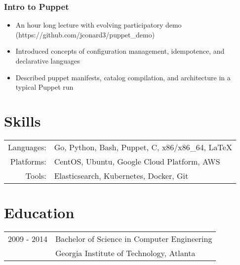 \documentclass[letterpaper]{article}
\begin{document}
\subsubsection*{Intro to Puppet}
\begin{itemize}[noitemsep]
	\item An hour long lecture with evolving participatory demo (https://github.com/jconard3/puppet\_demo)
	\item Introduced concepts of configuration management, idempotence, and declarative languages
	\item Described puppet manifests, catalog compilation, and architecture in a typical Puppet run
\end{itemize}

\section*{Skills}
\begin{tabular}{rl}
    Languages: & Go, Python, Bash, Puppet, C, x86/x86\_64, \LaTeX\\
    Platforms: & CentOS, Ubuntu, Google Cloud Platform, AWS\\
    Tools: & Elasticsearch, Kubernetes, Docker, Git\\
\end{tabular}

\section*{Education}
\begin{tabular}{rl}
    2009 - 2014 & Bachelor of Science in {Computer Engineering}\\
    & {Georgia Institute of Technology}, Atlanta\\
\end{tabular}
\end{document}
